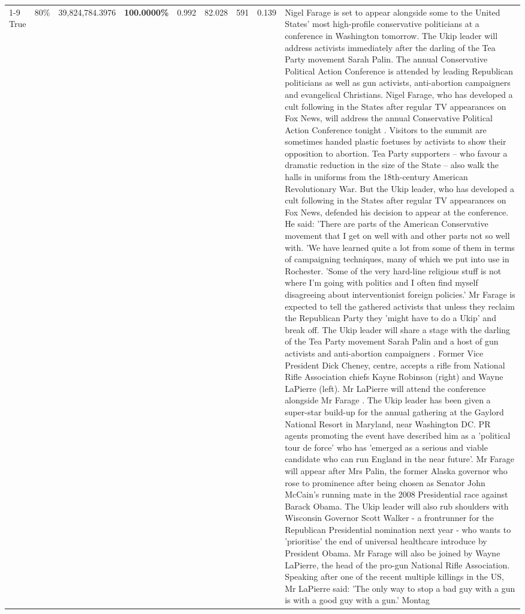 \begin{table}[H]
\begin{tabular}{lllrlllll}
\cline{1-9} \cline{2-9}
True & 80\% & 39,824,784.3976 & \bfseries \color{red} 100.0000\% & 0.992 & 82.028 & 591 & 0.139 & Nigel Farage is set to appear alongside some to the United States' most high-profile conservative politicians at a conference in Washington tomorrow. The Ukip leader will address activists immediately after the darling of the Tea Party movement Sarah Palin. The annual Conservative Political Action Conference is attended by leading Republican politicians as well as gun activists, anti-abortion campaigners and evangelical Christians. Nigel Farage, who has developed a cult following in the States after regular TV appearances on Fox News, will address the annual Conservative Political Action Conference tonight . Visitors to the summit are sometimes handed plastic foetuses by activists to show their opposition to abortion. Tea Party supporters – who favour a dramatic reduction in the size of the State – also walk the halls in uniforms from the 18th-century American Revolutionary War. But the Ukip leader, who has developed a cult following in the States after regular TV appearances on Fox News, defended his decision to appear at the conference. He said: 'There are parts of the American Conservative movement that I get on well with and other parts not so well with. 'We have learned quite a lot from some of them in terms of campaigning techniques, many of which we put into use in Rochester. 'Some of the very hard-line religious stuff is not where I'm going with politics and I often find myself disagreeing about interventionist foreign policies.' Mr Farage is expected to tell the gathered activists that unless they reclaim the Republican Party they 'might have to do a Ukip' and break off. The Ukip leader will share a stage with the darling of the Tea Party movement Sarah Palin and a host of gun activists and anti-abortion campaigners . Former Vice President Dick Cheney, centre, accepts a rifle from National Rifle Association chiefs Kayne Robinson (right) and Wayne LaPierre (left). Mr LaPierre will attend the conference alongside Mr Farage . The Ukip leader has been given a super-star build-up for the annual gathering at the Gaylord National Resort in Maryland, near Washington DC. PR agents promoting the event have described him as a 'political tour de force' who has 'emerged as a serious and viable candidate who can run England in the near future'. Mr Farage will appear after Mrs Palin, the former Alaska governor who rose to prominence after being chosen as Senator John McCain's running mate in the 2008 Presidential race against Barack Obama. The Ukip leader will also rub shoulders with Wisconsin Governor Scott Walker - a frontrunner for the Republican Presidential nomination next year - who wants to 'prioritise' the end of universal healthcare introduce by President Obama. Mr Farage will also be joined by Wayne LaPierre, the head of the pro-gun National Rifle Association. Speaking after one of the recent multiple killings in the US, Mr LaPierre said: 'The only way to stop a bad guy with a gun is with a good guy with a gun.' Montag \\

\end{tabular}
\end{table}
